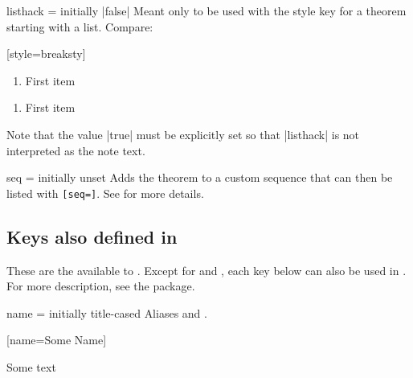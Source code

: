 \documentclass{ltxdoc}
\newcommand{\bracks}[1]{\texttt{[#1]}}
\begin{document}
\begin{docKey}{listhack}
  {=\textbar{}}
  {initially |false|}
Meant only to be used with the  style key for a theorem starting with a list.
Compare:

\begin{codepreamble}
[style=breaksty]
\end{codepreamble}

\begin{keythmscode}[withpreamble]
\begin{observation}
\begin{enumerate}
\item First item
\end{enumerate}
\end{observation}

\begin{observation}[listhack=true]
\begin{enumerate}
\item First item
\end{enumerate}
\end{observation}
\end{keythmscode}

Note that the value |true| must be explicitly set so that |listhack| is not interpreted as the note text.
\end{docKey}

\begin{docKey}[][doc label=thm/seq]{seq}
  {=}
  {initially unset}
Adds the theorem to a custom sequence  that can then be listed with \bracks{seq=}.
See  for more details.
\end{docKey}

\subsection{Keys also defined in } \label{thm-thmtools-keys}

These are the  available to .
Except for  and , each key below can also be used in .
For more description, see the \href{https://ctan.org/pkg/thmtools}{} package.

\begin{docKey}[][doc label=thm/name]{name}
  {=}
  {initially title-cased }
Aliases  and .

\begin{codepreamble}
[name=Some Name]
\end{codepreamble}

\begin{keythmscode}[withpreamble]
\begin{mythm}
Some text
\end{mythm}
\end{keythmscode}

\end{docKey}
\end{document}

